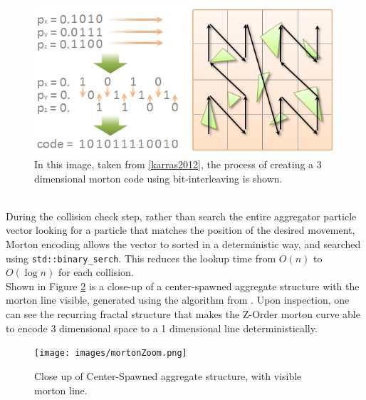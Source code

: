 \documentclass[fleqn,10pt]{UserGuideArx} %
\begin{document}
\begin{figure}[!h]\centering %
    \includegraphics[width=\linewidth]{images/fig04-z-curvekarras.png}
    \caption{In this image, taken from \ref{karras2012}, the process of creating a 3 dimensional morton code using bit-interleaving is shown.}
    \label{fig:KarrasMortonGeneration}
    \end{figure}

~\\
During the collision check step, rather than search the entire aggregator particle vector looking for a particle that matches the position of the desired movement, Morton encoding allows the vector to sorted in a deterministic way, and searched using \texttt{std\allowbreak::binary\_serch}. This reduces the lookup time from $O(n)$ to $O(\log n)$ for each collision.\\

Shown in Figure \ref{fig:MortonZoom} is a close-up of a center-spawned aggregate structure with the morton line visible, generated using the algorithm from \cite{Karras:2012}. Upon inspection, one can see the recurring fractal structure that makes the Z-Order morton curve able to encode 3 dimensional space to a 1 dimensional line deterministically.

\begin{figure}[!h]\centering %
    \texttt{[image: images/mortonZoom.png]}
    \caption{Close up of Center-Spawned aggregate structure, with visible morton line.}
    \label{fig:MortonZoom}
    \end{figure}
\end{document}

